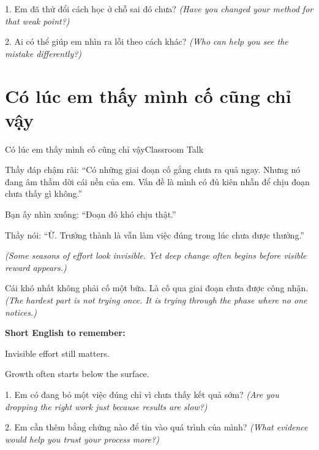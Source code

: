 \begin{tuhocnhanh}
1. Em đã thử đổi cách học ở chỗ sai đó chưa? \textit{(Have you changed your method for that weak point?)}

2. Ai có thể giúp em nhìn ra lỗi theo cách khác? \textit{(Who can help you see the mistake differently?)}
\end{tuhocnhanh}
\ngancach

\section{Có lúc em thấy mình cố cũng chỉ vậy}
\begin{truyen}{Có lúc em thấy mình cố cũng chỉ vậy}{Classroom Talk}

Thầy đáp chậm rãi: ``Có những giai đoạn cố gắng chưa ra quả ngay. Nhưng nó đang âm thầm dời cái nền của em. Vấn đề là mình có đủ kiên nhẫn để chịu đoạn chưa thấy gì không.''

Bạn ấy nhìn xuống: ``Đoạn đó khó chịu thật.''

Thầy nói: ``Ừ. Trưởng thành là vẫn làm việc đúng trong lúc chưa được thưởng.''

\textit{(Some seasons of effort look invisible. Yet deep change often begins before visible reward appears.)}
\end{truyen}

\begin{baihoc}
Cái khó nhất không phải cố một bữa. Là cố qua giai đoạn chưa được công nhận.
\textit{(The hardest part is not trying once. It is trying through the phase where no one notices.)}
\end{baihoc}

\begin{ghinhoanh}
\textbf{Short English to remember:}

Invisible effort still matters.

Growth often starts below the surface.
\end{ghinhoanh}

\begin{tuhocnhanh}
1. Em có đang bỏ một việc đúng chỉ vì chưa thấy kết quả sớm? \textit{(Are you dropping the right work just because results are slow?)}

2. Em cần thêm bằng chứng nào để tin vào quá trình của mình? \textit{(What evidence would help you trust your process more?)}
\end{tuhocnhanh}
\ngancach